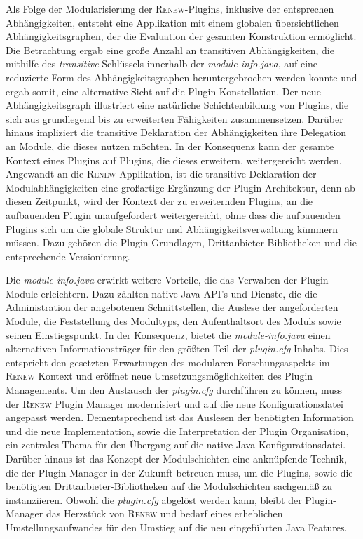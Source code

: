 Als Folge der Modularisierung der \textsc{Renew}-Plugins, inklusive der entsprechen Abhängigkeiten, entsteht eine Applikation mit einem globalen übersichtlichen Abhängigkeitsgraphen, der die Evaluation der gesamten Konstruktion ermöglicht. Die Betrachtung ergab eine große Anzahl an transitiven Abhängigkeiten, die mithilfe des \textit{transitive} Schlüssels innerhalb der \textit{module-info.java}, auf eine reduzierte Form des Abhängigkeitsgraphen heruntergebrochen werden konnte und ergab somit, eine alternative Sicht auf die Plugin Konstellation. Der neue Abhängigkeitsgraph illustriert eine natürliche Schichtenbildung von Plugins, die sich aus grundlegend bis zu erweiterten Fähigkeiten zusammensetzen. Darüber hinaus impliziert die transitive Deklaration der Abhängigkeiten ihre Delegation an Module, die dieses nutzen möchten. In der Konsequenz kann der gesamte Kontext eines Plugins auf Plugins, die dieses erweitern, weitergereicht werden. \newline
Angewandt an die \textsc{Renew}-Applikation, ist die transitive Deklaration der Modulabhängigkeiten eine großartige Ergänzung der Plugin-Architektur, denn ab diesen Zeitpunkt, wird der Kontext der zu erweiternden Plugins, an die aufbauenden Plugin unaufgefordert weitergereicht, ohne dass die aufbauenden Plugins sich um die globale Struktur und Abhängigkeitsverwaltung kümmern müssen. Dazu gehören die Plugin Grundlagen, Drittanbieter Bibliotheken und die entsprechende Versionierung.\bigbreak

Die \textit{module-info.java} erwirkt weitere Vorteile, die das Verwalten der Plugin-Module erleichtern. Dazu zählten native Java API's und Dienste, die die Administration der angebotenen Schnittstellen, die Auslese der angeforderten Module, die Feststellung des Modultyps, den Aufenthaltsort des Moduls sowie seinen Einstiegspunkt. In der Konsequenz, bietet die \textit{module-info.java} einen alternativen Informationsträger für den größten Teil der \textit{plugin.cfg} Inhalts. Dies entspricht den gesetzten Erwartungen des modularen Forschungsaspekts im \textsc{Renew} Kontext und eröffnet neue Umsetzungsmöglichkeiten des Plugin Managements.\newline
Um den Austausch der \textit{plugin.cfg} durchführen zu können, muss der \textsc{Renew} Plugin Manager modernisiert und auf die neue Konfigurationsdatei angepasst werden. Dementsprechend ist das Auslesen der benötigten Information und die neue Implementation, sowie die Interpretation der Plugin Organisation, ein zentrales Thema für den Übergang auf die native Java Konfigurationsdatei. Darüber hinaus ist das Konzept der Modulschichten eine anknüpfende Technik, die der Plugin-Manager in der Zukunft betreuen muss, um die Plugins, sowie die benötigten Drittanbieter-Bibliotheken auf die Modulschichten sachgemäß zu instanziieren.\newline
Obwohl die \textit{plugin.cfg} abgelöst werden kann, bleibt der Plugin-Manager das Herzstück von \textsc{Renew} und bedarf eines erheblichen Umstellungsaufwandes für den Umstieg auf die neu eingeführten Java Features.\bigbreak

